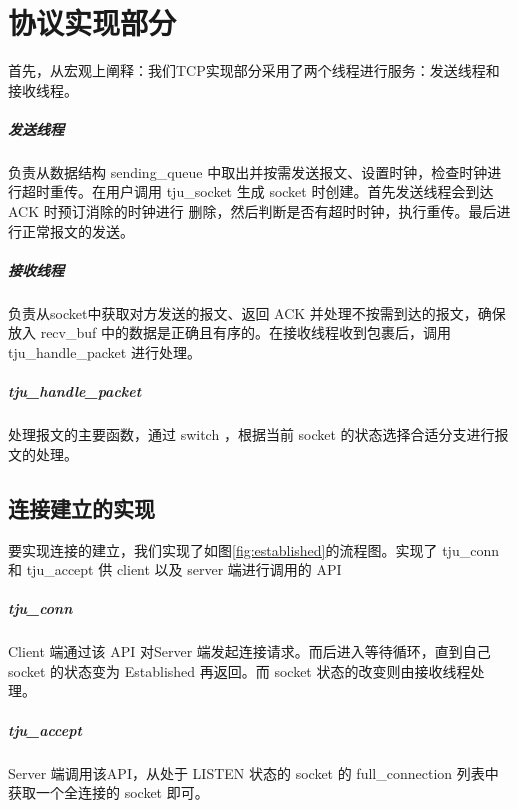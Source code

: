 \chapter{协议实现部分}

首先，从宏观上阐释：我们TCP实现部分采用了两个线程进行服务：发送线程和接收线程。

\paragraph*{发送线程} 负责从数据结构 sending\_queue 中取出并按需发送报文、设置时钟，检查时钟进行超时重传。在用户调用 tju\_socket 生成 socket 时创建。首先发送线程会到达 ACK 时预订消除的时钟进行 删除，然后判断是否有超时时钟，执行重传。最后进行正常报文的发送。

\paragraph*{接收线程} 负责从socket中获取对方发送的报文、返回 ACK 并处理不按需到达的报文，确保放入 recv\_buf 中的数据是正确且有序的。在接收线程收到包裹后，调用 tju\_handle\_packet 进行处理。

\paragraph*{tju\_handle\_packet} 处理报文的主要函数，通过 switch ，根据当前 socket 的状态选择合适分支进行报文的处理。

\section{连接建立的实现}

要实现连接的建立，我们实现了如图\ref{fig:established}的流程图。实现了 tju\_conn 和 tju\_accept 供 client 以及 server 端进行调用的 API

\paragraph*{tju\_conn} Client 端通过该 API 对Server 端发起连接请求。而后进入等待循环，直到自己 socket 的状态变为 Established 再返回。而 socket 状态的改变则由接收线程处理。

\paragraph*{tju\_accept} Server 端调用该API，从处于 LISTEN 状态的 socket 的 full\_connection 列表中获取一个全连接的 socket 即可。

